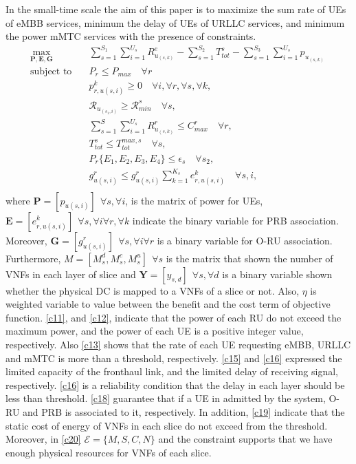 \documentclass{article}
\begin{document}
In the small-time scale the aim of this paper is to maximize the sum rate of UEs  of eMBB services, minimum the delay of UEs of URLLC services, and minimum the power mMTC services with the presence of constraints.
\begin{subequations}
\begin{alignat}{4}
\max\limits_{\boldsymbol{P}, \boldsymbol{E}, \boldsymbol{G} }   \quad &  \sum_{s=1}^{S_1}\sum_{i=1}^{U_s}R_{u_{(s,k)}}^e - \sum_{s=1}^{S_2}T^s_{tot} - \sum_{s=1}^{S_3}\sum_{i=1}^{U_s} p_{u_{(s,k)}} \ \\
\text{subject to} \quad  &  P_r \leq P_{max} \quad \forall r
 \label{c11} \\
&p_{r,u(s,i)}^{k}  \geq 0  \quad \forall i,\forall r,\forall s, \forall k,\label{c12} \\
&\mathcal{R}_{u_{(s_1,i)}} \geq  \mathcal{R}_{min}^{s} \quad \forall s, \label{c13} \\
& \sum_{s=1}^{S}\sum_{i=1}^{U_s}R_{u_{(s,k)}}^r \leq C_{max}^r \quad \forall r, \label{c15}\\ 
&T_{tot}^s \leq T_{tot}^{max,s} \quad \forall s,\label{c16} \\
& P_r\{E_1, E_2, E_3, E_4\} \leq \epsilon_s \quad \forall s_2, \label{c166}\\
& g^r_{u(s,i)} \leq g^r_{u(s,i)}\sum_{k =1}^{K_s} e^{k}_{r,u(s,i)}  \quad \forall s,i , \label{c18} \\
\end{alignat}
\label{constraints}
\end{subequations}
where $\boldsymbol{P} =[p_{u(s,i)}] \:\: \forall s , \forall i $, is the matrix of power for UEs,
$\boldsymbol{E} =[e_{r,u(s,i)}^k] \:\: \forall s , \forall i \forall r, \forall k$ indicate the binary variable for PRB association. Moreover, $\boldsymbol{G} =[g_{u(s,i)}^r] \:\: \forall s , \forall i \forall r$ is a binary variable for O-RU association. Furthermore, $M = [M_s^d, M_s^c, M_s^u] \:\: \forall s$ is the matrix that shown the number of VNFs in each layer of slice and $\boldsymbol{Y} =[y_{s,d}]  \:\: \forall s ,  \forall d $ is a binary variable shown whether
the physical DC is mapped to a VNFs of a slice or not.
Also, $\eta$ is weighted variable to value between the benefit and the cost term of objective function.
\eqref{c11}, and \eqref{c12}, indicate that the power of each RU do not exceed the maximum power, and the power of each UE is a positive integer value, respectively. 
Also \eqref{c13}  shows that the rate of each UE requesting eMBB, URLLC and mMTC is more than a threshold, respectively.
\eqref{c15} and \eqref{c16} expressed the limited capacity of the fronthaul link, and the limited delay of receiving signal, respectively.
\eqref{c16} is a reliability condition that the delay in each layer should be less than threshold.
 \eqref{c18} guarantee that if a UE in admitted by the system, O-RU and PRB is associated to it, respectively.
In addition, \eqref{c19} indicate that the static cost of energy of VNFs in each slice do not exceed from the threshold. 
Moreover, in \eqref{c20}  $\mathcal{E} = \{M,S,C, N\}$ and the constraint supports
that we have enough physical resources for VNFs of each slice.
\end{document}
